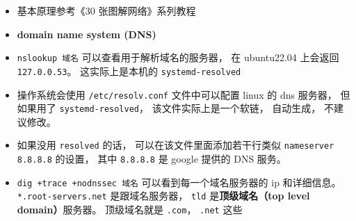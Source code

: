 
\begin{itemize}
\item 基本原理参考《30 张图解网络》系列教程
\item \textbf{domain name system (DNS)}
\item \verb|nslookup 域名| 可以查看用于解析域名的服务器， 在 ubuntu22.04 上会返回 \verb|127.0.0.53|。 这实际上是本机的 \verb|systemd-resolved|
\item 操作系统会使用 \verb|/etc/resolv.conf| 文件中可以配置 linux 的 dns 服务器， 但如果用了 \verb|systemd-resolved|， 该文件实际上是一个软链， 自动生成， 不建议修改。
\item 如果没用 \verb|resolved| 的话， 可以在该文件里面添加若干行类似 \verb|nameserver 8.8.8.8| 的设置， 其中 \verb|8.8.8.8| 是 google 提供的 DNS 服务。
\item \verb|dig +trace +nodnssec 域名| 可以看到每一个域名服务器的 ip 和详细信息。 \verb|*.root-servers.net| 是跟域名服务器， \verb|tld| 是\textbf{顶级域名（top level domain）}服务器。 顶级域名就是 \verb|.com|， \verb|.net| 这些
\end{itemize}
